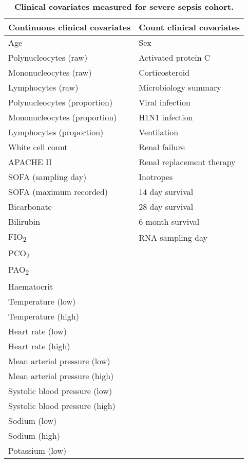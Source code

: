 \clearpage
\begin{table}[H]
  \centering
	\singlespacing
  \caption[Clinical covariates measured for severe sepsis cohort]{\textbf{Clinical covariates measured for severe sepsis cohort.}}
    \begin{tabular}{ll}
    \toprule
   \textbf{ Continuous clinical covariates} & \textbf{Count clinical covariates} \\
    \midrule
    Age   & Sex \\
    Polynucleocytes (raw) & Activated protein C \\
    Mononucleocytes (raw) & Corticosteroid \\
    Lymphocytes (raw) & Microbiology summary \\
    Polynucleocytes (proportion) & Viral infection \\
    Mononucleocytes (proportion) & H1N1 infection \\
    Lymphocytes (proportion) & Ventilation \\
    White cell count & Renal failure \\
    APACHE II & Renal replacement therapy \\
    SOFA (sampling day) & Inotropes \\
    SOFA (maximum recorded) & 14 day survival \\
    Bicarbonate & 28 day survival \\
    Bilirubin & 6 month survival \\
    FIO\textsubscript{2}  &   RNA sampling day \\
    PCO\textsubscript{2}  &  \\
    PAO\textsubscript{2}  &  \\
    Haematocrit &  \\
    Temperature (low) &  \\
    Temperature (high) &  \\
    Heart rate (low) &  \\
    Heart rate (high) &  \\
    Mean arterial pressure (low) &  \\
    Mean arterial pressure (high) &  \\
    Systolic blood pressure (low) &  \\
    Systolic blood pressure (high) &  \\
    Sodium (low) &  \\
    Sodium (high) &  \\
    Potassium (low) & \\

\end{tabular}
\end{table}
